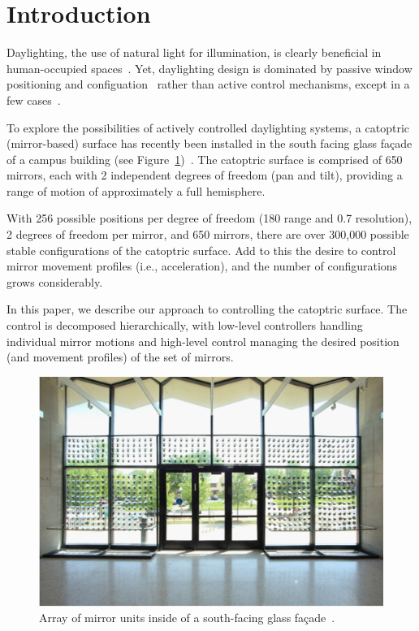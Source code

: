 \section{Introduction}
\label{sec:intro}

Daylighting, the use of natural light for illumination, is clearly
beneficial in human-occupied
spaces~\cite{hhm15,Leslie03}.
Yet, daylighting design is dominated by passive window positioning
and configuation~\cite{Leslie03} rather than active control mechanisms,
except in a few cases~\cite{kt16}.

To explore the possibilities of actively controlled daylighting systems,
a catoptric (mirror-based) surface has recently been installed in
the south facing glass fa\c cade of a campus building
(see Figure~\ref{fig:steinberg})~\cite{acadia18}.
The catoptric surface is comprised of 650 mirrors, each with 2 independent
degrees of freedom (pan and tilt), providing a range of motion of
approximately a full hemisphere.

With 256 possible positions per degree of freedom (180\degree{} range
and 0.7\degree{} resolution), 2 degrees of freedom per mirror, and 650 mirrors, 
there are over 300,000 possible stable configurations of the catoptric surface.
Add to this the desire to control mirror movement profiles (i.e.,
acceleration), and the number of configurations grows considerably.

In this paper, we describe our approach to controlling the catoptric surface.
The control is decomposed hierarchically, with low-level controllers
handling individual mirror motions and high-level control managing the
desired position (and movement profiles) of the set of mirrors.

\begin{figure}[ht]
\includegraphics[width=0.92\columnwidth]{steinberg}
\caption{Array of mirror units inside of a south-facing glass fa\c cade~\protect\cite{acadia18}.}
\label{fig:steinberg}
\end{figure}


